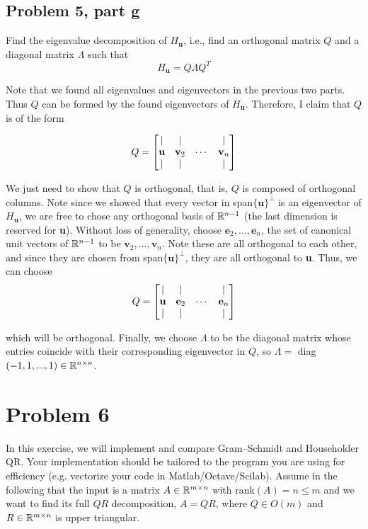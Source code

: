 \subsection{Problem 5, part g}
Find the eigenvalue decomposition of $H_\textbf{u}$, i.e., find an orthogonal matrix $Q$ and a diagonal matrix $\Lambda$ such that 
\[
H_\textbf{u} = Q\Lambda Q^T
\]
\partbreak
\begin{solution}

    Note that we found all eigenvalues and eigenvectors in the previous two parts. Thus $Q$ can be formed by the found eigenvectors of $H_\textbf{u}.$ Therefore, I claim that $Q$ is of the form 

    \[
    Q = \mqty[\vert &\vert &&\vert\\\textbf{u} &\textbf{v}_2&\cdots &\textbf{v}_n\\\vert &\vert &&\vert]
    \]

    We just need to show that $Q$ is orthogonal, that is, $Q$ is composed of orthogonal columns. Note since we showed that every vector in  span$\{ \textbf{u}\}^\perp$ is an eigenvector of $H_\textbf{u}$, we are free to chose any orthogonal basis of $\mathbb{R}^{n - 1}$ (the last dimension is reserved for \textbf{u}). Without loss of generality, choose $\textbf{e}_2, ..., \textbf{e}_{n}$, the set of canonical unit vectors of $\mathbb{R}^{n - 1}$ to be $\textbf{v}_2, ..., \textbf{v}_n$. Note these are all orthogonal to each other, and since they are chosen from span$\{ \textbf{u}\}^\perp$, they are all orthogonal to \textbf{u}. Thus, we can choose 
    \[
    Q = \mqty[\vert &\vert &&\vert\\\textbf{u} &\textbf{e}_2&\cdots &\textbf{e}_n\\\vert &\vert &&\vert]
    \]

    which will be orthogonal. Finally, we choose $\Lambda$ to be the diagonal matrix whose entries coincide with their corresponding eigenvector in $Q$, so $\Lambda = $ diag$(-1, 1, ..., 1) \in \mathbb{R}^{n\times n}$.
\end{solution}

\section{Problem 6}
In this exercise, we will implement and compare Gram–Schmidt and Householder QR. Your implementation should be tailored to the program you are using for efficiency (e.g. vectorize your code in Matlab/Octave/Scilab). Assume in the following that the input is a matrix $A\in \mathbb{R}^{m \times n}$ with rank$(A) = n \leq m$ and we want to find its full $QR$ decomposition, $A = QR$, where $Q \in O(m)$ and $R\in \mathbb{R}^{m \times n}$ is upper triangular.

